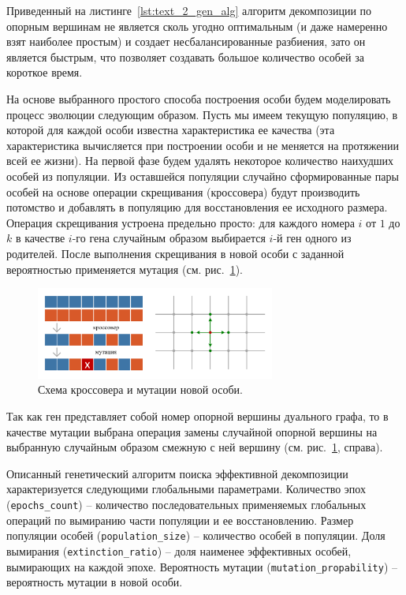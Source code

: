 Приведенный на листинге~\ref{lst:text_2_gen_alg} алгоритм декомпозиции по опорным вершинам не является сколь угодно оптимальным (и даже намеренно взят наиболее простым) и создает несбалансированные разбиения, зато он является быстрым, что позволяет создавать большое количество особей за короткое время.

На основе выбранного простого способа построения особи будем моделировать процесс эволюции следующим образом.
Пусть мы имеем текущую популяцию, в которой для каждой особи известна характеристика ее качества (эта характеристика вычисляется при построении особи и не меняется на протяжении всей ее жизни).
На первой фазе будем удалять некоторое количество наихудших особей из популяции.
Из оставшейся популяции случайно сформированные пары особей на основе операции скрещивания (кроссовера)\label{term:crossover} будут производить потомство и добавлять в популяцию для восстановления ее исходного размера.
Операция скрещивания устроена предельно просто: для каждого номера $i$ от $1$ до $k$ в качестве $i$-го гена случайным образом выбирается $i$-й ген одного из родителей.
После выполнения скрещивания в новой особи с заданной вероятностью применяется мутация (см. рис.~\ref{fig:text_2_genetic_cross_mut})\label{term:mutation}.

\begin{figure}[ht]
\centering
\includegraphics[width=0.7\textwidth]{./pics/text_2_genetic/cross-mut.pdf}
\singlespacing
{}\caption{Схема кроссовера и мутации новой особи.}
\label{fig:text_2_genetic_cross_mut}
\end{figure}

Так как ген представляет собой номер опорной вершины дуального графа, то в качестве мутации выбрана операция замены случайной опорной вершины на выбранную случайным образом смежную с ней вершину (см. рис.~\ref{fig:text_2_genetic_cross_mut}, справа).

Описанный генетический алгоритм поиска эффективной декомпозиции характеризуется следующими глобальными параметрами. Количество эпох (\texttt{epochs\_count}) -- количество последовательных применяемых глобальных операций по вымиранию части популяции и ее восстановлению.
Размер популяции особей (\texttt{population\_size}) -- количество особей в популяции.
Доля вымирания (\texttt{extinction\_ratio}) – доля наименее эффективных особей, вымирающих на каждой эпохе.
Вероятность мутации (\texttt{mutation\_propability}) -- вероятность мутации в новой особи.

